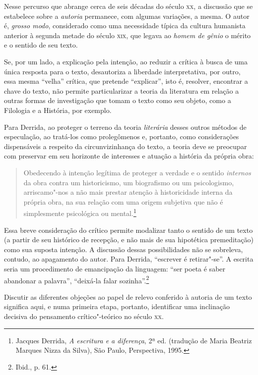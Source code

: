 Nesse percurso que abrange cerca de seis décadas do século \textsc{xx},
a discussão que se estabelece sobre a \emph{autoria} permanece, com
algumas variações, a mesma. O autor é, \emph{grosso modo}, considerado
como uma necessidade típica da cultura humanista anterior à segunda
metade do século \textsc{xix}, que legava ao \emph{homem de gênio} o
mérito e o sentido de seu texto.

Se, por um lado, a explicação pela intenção, ao reduzir a crítica à
busca de uma única resposta para o texto, desautoriza a liberdade
interpretativa, por outro, essa mesma ``velha'' crítica, que pretende
``explicar'', isto é, resolver, encontrar a chave do texto, não permite
particularizar a teoria da literatura em relação a outras formas de
investigação que tomam o texto como seu objeto, como a Filologia e a
História, por exemplo.

Para Derrida, ao proteger o terreno da teoria \emph{literária} desses
outros métodos de especulação, ao tratá-los como prolegômenos e,
portanto, como considerações dispensáveis a respeito da circunvizinhança
do texto, a teoria deve se preocupar com preservar em seu horizonte de
interesses e atuação a história da própria obra:

\begin{quote}
Obedecendo à intenção legítima de proteger a verdade e o
sentido \emph{internos} da obra contra um historicismo, um biografismo
ou um psicologismo, arriscamo"-nos a não mais prestar atenção à
historicidade interna da própria obra, na sua relação com uma origem
subjetiva que não é simplesmente psicológica ou mental.\footnote{Jacques
  Derrida, \emph{A escritura e a diferença}, 2ª ed. (tradução de Maria
  Beatriz Marques Nizza da Silva), São Paulo, Perspectiva, 1995.}
\end{quote}

Essa breve consideração do crítico permite modalizar tanto o sentido de
um texto (a partir de seu histórico de recepção, e não mais de sua
hipotética premeditação) como sua suposta intenção. A discussão dessas
possibilidades não se sobreleva, contudo, ao apagamento do autor. Para
Derrida, ``escrever é retirar"-se''. A escrita seria um procedimento de
emancipação da linguagem: ``ser poeta é saber abandonar a palavra'',
``deixá-la falar sozinha''.\footnote{Ibid., p. 61.}

Discutir as diferentes objeções ao papel de relevo conferido à autoria
de um texto significa aqui, e numa primeira etapa, portanto, identificar
uma inclinação decisiva do pensamento crítico"-teórico no século
\textsc{xx}.

